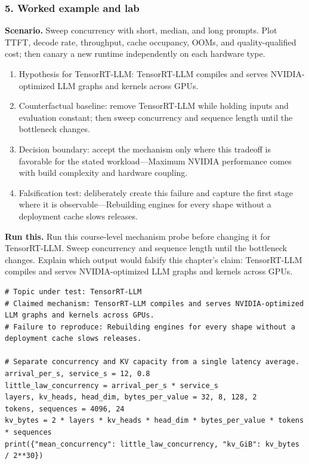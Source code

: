 \subsubsection*{5. Worked example and lab}
\textbf{Scenario.} Sweep concurrency with short, median, and long prompts. Plot TTFT, decode rate, throughput, cache occupancy, OOMs, and quality-qualified cost; then canary a new runtime independently on each hardware type.
\begin{enumerate}
\item Hypothesis for TensorRT-LLM: TensorRT-LLM compiles and serves NVIDIA-optimized LLM graphs and kernels across GPUs.
\item Counterfactual baseline: remove TensorRT-LLM while holding inputs and evaluation constant; then sweep concurrency and sequence length until the bottleneck changes.
\item Decision boundary: accept the mechanism only where this tradeoff is favorable for the stated workload—Maximum NVIDIA performance comes with build complexity and hardware coupling.
\item Falsification test: deliberately create this failure and capture the first stage where it is observable—Rebuilding engines for every shape without a deployment cache slows releases.
\end{enumerate}
\textbf{Run this.} Run this course-level mechanism probe before changing it for TensorRT-LLM. Sweep concurrency and sequence length until the bottleneck changes. Explain which output would falsify this chapter's claim: TensorRT-LLM compiles and serves NVIDIA-optimized LLM graphs and kernels across GPUs.
\begin{Verbatim}[fontsize=\scriptsize]
# Topic under test: TensorRT-LLM
# Claimed mechanism: TensorRT-LLM compiles and serves NVIDIA-optimized LLM graphs and kernels across GPUs.
# Failure to reproduce: Rebuilding engines for every shape without a deployment cache slows releases.

# Separate concurrency and KV capacity from a single latency average.
arrival_per_s, service_s = 12, 0.8
little_law_concurrency = arrival_per_s * service_s
layers, kv_heads, head_dim, bytes_per_value = 32, 8, 128, 2
tokens, sequences = 4096, 24
kv_bytes = 2 * layers * kv_heads * head_dim * bytes_per_value * tokens * sequences
print({"mean_concurrency": little_law_concurrency, "kv_GiB": kv_bytes / 2**30})
\end{Verbatim}
